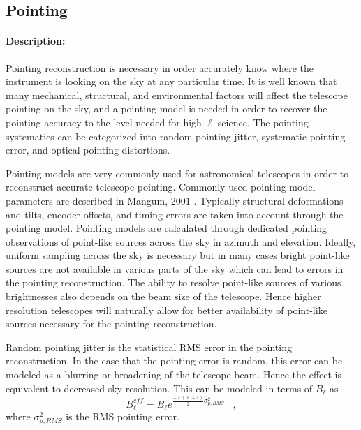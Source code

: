 \subsection{Pointing}

\paragraph{Description:}
Pointing reconstruction is necessary in order accurately know where the instrument is looking on the sky at any particular time. It is well known that many mechanical, structural, and environmental factors will affect the telescope pointing on the sky, and a pointing model is needed in order to recover the pointing accuracy to the level needed for high $\ell$ science. The pointing systematics can be categorized into random pointing jitter, systematic pointing error, and optical pointing distortions.

Pointing models are very commonly used for astronomical telescopes in order to reconstruct accurate telescope pointing. Commonly used pointing model parameters are described in Mangum, 2001 \cite{Mangum2001}. Typically structural deformations and tilts, encoder offsets, and timing errors are taken into account through the pointing model. Pointing models are calculated through dedicated pointing observations of point-like sources across the sky in azimuth and elevation. Ideally, uniform sampling across the sky is necessary but in many cases bright point-like sources are not available in various parts of the sky which can lead to errors in the pointing reconstruction. The ability to resolve point-like sources of various brightnesses also depends on the beam size of the telescope. Hence higher resolution telescopes will naturally allow for better availability of point-like sources necessary for the pointing reconstruction.

Random pointing jitter is the statistical RMS error in the pointing reconstruction. In the case that the pointing error is random, this error can be modeled as a blurring or broadening of the telescope beam. Hence the effect is equivalent to decreased sky resolution. This can be modeled in terms of $B_{\ell}$ as
\begin{equation}
B_{\ell}^{eff} = B_{\ell} e^{\frac{-\ell(\ell+1)}{2} \sigma^{2}_{p,RMS}}  \,\,\,\,\, ,
\end{equation}
where $\sigma^{2}_{p,RMS}$ is the RMS pointing error. 

